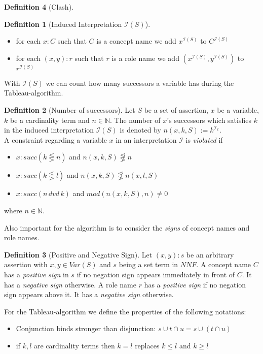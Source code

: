 \documentclass[a4paper,11pt]{scrartcl}
\theoremstyle{break}
\theoremstyle{definition}
\newtheorem{mydef}{Definition}
\begin{document}
\begin{mydef}[Clash]
\begin{mydef}[Induced Interpretation $\mathcal{I}(S)$]
\begin{itemize}
\item for each $x:C$ such that $C$ is a concept name we add $x^{\mathcal{I}(S)}$ to $C^{\mathcal{I}(S)}$
\item for each $(x,y):r$ such that $r$ is a role name we add $(x^{\mathcal{I}(S)},y^{\mathcal{I}(S)})$ to $r^{\mathcal{I}(S)}$
\end{itemize}
\end{mydef}
With $\mathcal{I}(S)$ we can count how many successors a variable has during the Tableau-algorithm.
\begin{mydef}[Number of successors]
Let $S$ be a set of assertion, $x$ be a variable, $k$ be a cardinality term and $n\in\mathbb{N}$. The number of $x$'s successors which satisfies $k$ in the induced interpretation $\mathcal{I}(S)$ is denoted by $n(x,k,S):=k^{\mathcal{I}_x}$.\\
A constraint regarding a variable $x$ in an interpretation $\mathcal{I}$ is \textit{violated} if
\begin{itemize}
\item $x:succ(k\lesseqgtr n)$ and $n(x,k,S)\not\lesseqgtr n$
\item $x:succ(k\lesseqgtr l)$ and $n(x,k,S)\not\lesseqgtr n(x,l,S)$
\item $x:succ(n\,dvd\,k)$ and $mod(n(x,k,S),n)\neq 0$
\end{itemize} 
where $n\in\mathbb{N}$.
\end{mydef}
Also important for the algorithm is to consider the \textit{signs} of concept names and role names.
\begin{mydef}[Positive and Negative Sign]
Let $(x,y):s$ be an arbitrary assertion with $x,y\in Var(S)$ and $s$ being a set term in $NNF$. A concept name $C$ has a \textit{positive sign} in $s$ if no negation sign appears immediately in front of $C$. It has a \textit{negative sign} otherwise. A role name $r$ has a \textit{positive sign} if no negation sign appears above it. It has a \textit{negative sign} otherwise.
\end{mydef}
For the Tableau-algorithm we define the properties of the following notations:
\begin{itemize}
\item Conjunction binds stronger than disjunction: $s\cup t\cap u = s\cup (t\cap u)$
\item if $k,l$ are cardinality terms then $k=l$ replaces $k\leq l$ and $k\geq l$ 
\end{itemize}
\iffalse

\end{mydef}
\end{document}
